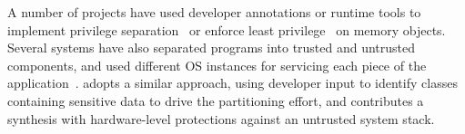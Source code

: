A number of projects have used  developer annotations or runtime tools
to implement privilege separation~\citep{brumley2004privtrans} or enforce least privilege~\citep{bittau2008wedge}
on memory objects.
Several systems have also separated programs into trusted and untrusted components, and used different OS instances
for servicing each piece of the application~\citep{singaravelu2006reducing, ta2006splitting, khatiwala2006data}.
\systemname{} adopts a similar approach, using developer input to identify classes containing sensitive data
to drive the partitioning effort, and contributes a synthesis with hardware-level protections against an untrusted system stack.




